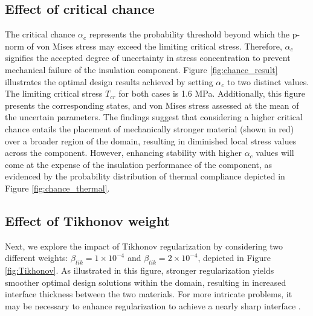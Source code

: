 \documentclass[pdf-a,balance,colorlinks,upint,subscriptcorrection,varvw,mathalfa=cal=boondoxo, spanish,french,vietnamese,russian,greek]{asmeconf}
\begin{document}
\subsection{Effect of critical chance}
\noindent
The critical chance $\alpha_{c}$ represents the probability threshold beyond which the p-norm of von Mises stress may exceed the limiting critical stress. Therefore, $\alpha_{c}$ signifies the accepted degree of uncertainty in stress concentration to prevent mechanical failure of the insulation component.
Figure \ref{fig:chance_result} illustrates the optimal design results achieved by setting $\alpha_{c}$ to two distinct values. The limiting critical stress $T_{cr}$ for both cases is 1.6 MPa. Additionally, this figure presents the corresponding states, and von Mises stress assessed at the mean of the uncertain parameters. The findings suggest that considering a higher critical chance entails the placement of mechanically stronger material (shown in red) over a broader region of the domain, resulting in diminished local stress values across the component. However, enhancing stability with higher $\alpha_{c}$ values will come at the expense of the insulation performance of the component, as evidenced by the probability distribution of thermal compliance depicted in Figure \ref{fig:chance_thermal}.



\subsection{Effect of Tikhonov weight}
\noindent
Next, we explore the impact of Tikhonov regularization by considering two different weights: $\beta_{tik} = 1 \times 10^{-4}$ and  $\beta_{tik} = 2 \times 10^{-4}$, depicted in Figure \ref{fig:Tikhonov}. 
As illustrated in this figure, stronger regularization yields smoother optimal design solutions within the domain, resulting in increased interface thickness between the two materials. For more intricate problems, it may be necessary to enhance regularization to achieve a nearly sharp interface \cite{tan2024scalable}.
\end{document}
